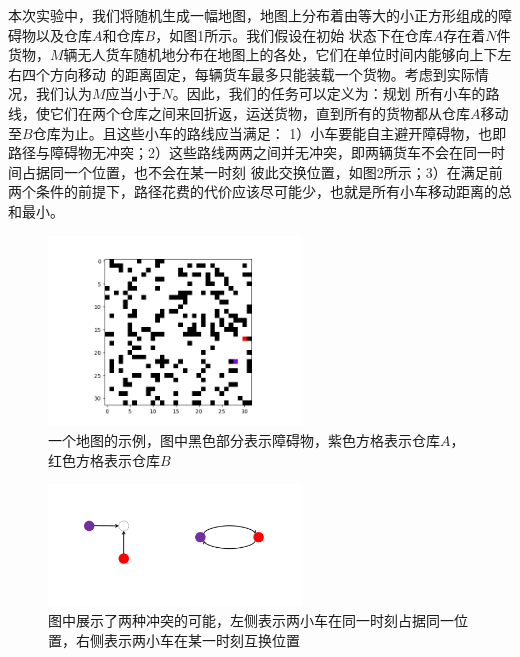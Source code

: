 \documentclass[UTF8]{ctexart}  %
\begin{document}
本次实验中，我们将随机生成一幅地图，地图上分布着由等大的小正方形组成的障碍物以及仓库$A$和仓库$B$，如图1所示。我们假设在初始
状态下在仓库$A$存在着$N$件货物，$M$辆无人货车随机地分布在地图上的各处，它们在单位时间内能够向上下左右四个方向移动
的距离固定，每辆货车最多只能装载一个货物。考虑到实际情况，我们认为$M$应当小于$N$。因此，我们的任务可以定义为：规划
所有小车的路线，使它们在两个仓库之间来回折返，运送货物，直到所有的货物都从仓库$A$移动至$B$仓库为止。且这些小车的路线应当满足：
1）小车要能自主避开障碍物，也即路径与障碍物无冲突；2）这些路线两两之间并无冲突，即两辆货车不会在同一时间占据同一个位置，也不会在某一时刻
彼此交换位置，如图2所示；3）在满足前两个条件的前提下，路径花费的代价应该尽可能少，也就是所有小车移动距离的总和最小。


\begin{figure}[H]
    \centering
    \centering
    \includegraphics[width=0.6\textwidth, keepaspectratio]{fig1.png}
    \captionsetup{font=footnotesize}
    \caption{一个地图的示例，图中黑色部分表示障碍物，紫色方格表示仓库$A$，红色方格表示仓库$B$}
    \label{figure1}
\end{figure}

\begin{figure}[H]
    \centering
    \centering
    \includegraphics[width=0.6\textwidth, keepaspectratio]{fig2.png}
    \captionsetup{font=footnotesize}
    \caption{图中展示了两种冲突的可能，左侧表示两小车在同一时刻占据同一位置，右侧表示两小车在某一时刻互换位置}
    \label{figure1}
\end{figure}

\end{document}
